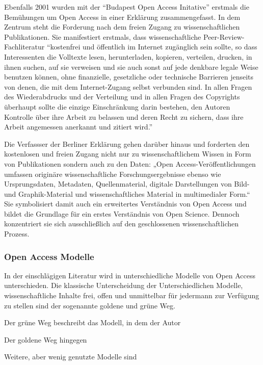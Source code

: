 Ebenfalls 2001 wurden mit der “Budapest Open Access Initative”\cite{cite:21} erstmals die Bemühungen um Open Access in einer Erklärung zusammengefasst\cite{cite:21a}. In dem Zentrum steht die Forderung nach dem freien Zugang zu wissenschaftlichen Publikationen. Sie manifestiert erstmals, dass wissenschaftliche Peer-Review-Fachliteratur “kostenfrei und öffentlich im Internet zugänglich sein sollte, so dass Interessenten die Volltexte lesen, herunterladen, kopieren, verteilen, drucken, in ihnen suchen, auf sie verweisen und sie auch sonst auf jede denkbare legale Weise benutzen können, ohne finanzielle, gesetzliche oder technische Barrieren jenseits von denen, die mit dem Internet-Zugang selbst verbunden sind. In allen Fragen des Wiederabdrucks und der Verteilung und in allen Fragen des Copyrights überhaupt sollte die einzige Einschränkung darin bestehen, den Autoren Kontrolle über ihre Arbeit zu belassen und deren Recht zu sichern, dass ihre Arbeit angemessen anerkannt und zitiert wird.” 

Die Verfassser der Berliner Erklärung gehen darüber hinaus und forderten den kostenlosen und freien Zugang nicht nur zu wissenschaftlichem Wissen in Form von Publikationen sondern auch zu den Daten: „Open Access-Veröffentlichungen umfassen originäre wissenschaftliche Forschungsergebnisse ebenso wie Ursprungsdaten, Metadaten, Quellenmaterial, digitale Darstellungen von Bild- und Graphik-Material und wissenschaftliches Material in multimedialer Form.“\cite{cite:22} Sie symbolisiert damit auch ein erweitertes Verständnis von Open Access und bildet die Grundlage für ein erstes Verständnis von Open Science. Dennoch konzentriert sie sich ausschließlich auf den geschlossenen wissenschaftlichen Prozess.

\subsubsection{Open Access Modelle}

In der einschlägigen Literatur wird in unterschiedliche Modelle von Open Access unterschieden\cite{cite:22a}. Die klassische Unterscheidung der Unterschiedlichen Modelle, wissenschaftliche Inhalte frei, offen und unmittelbar für jedermann zur Verfügung zu stellen sind der sogenannte goldene und grüne Weg.\cite{cite:22b} 

Der grüne Weg beschreibt das Modell, in dem der Autor

Der goldene Weg hingegen

Weitere, aber wenig genutzte Modelle sind

